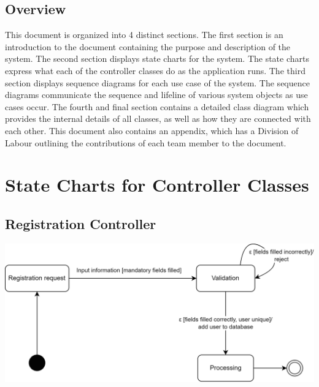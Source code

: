 \documentclass[]{article}
\begin{document}
\subsection{Overview}
\label{sub:overview}
This document is organized into 4 distinct sections. The first section is an introduction to the document containing the purpose and description of the system. The second section displays 
state charts for the system. The state charts express what each of the controller classes do as the application runs. The third section displays sequence diagrams for each use case 
of the system. The sequence diagrams communicate the sequence and lifeline of various system objects as use cases occur. The fourth and final section 
contains a detailed class diagram which provides the internal details of all classes, as well as how they are connected with each other. This document also 
contains an appendix, which has a Division of Labour outlining the contributions of each team member to the document.



\section{State Charts for Controller Classes}
\label{sec:state_charts_for_controller_classes}

\subsection*{Registration Controller}
\includegraphics{StateCharts/Registration.png}
\end{document}
